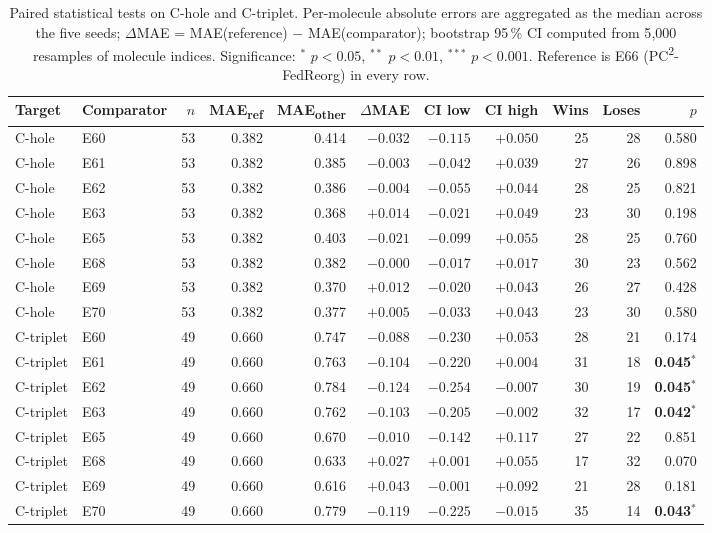\documentclass[11pt,a4paper]{article}
\newcommand{\PC}{PC\textsuperscript{2}-FedReorg}
\begin{document}
\begin{table}[t]
\centering
\small
\caption{Paired statistical tests on C-hole and C-triplet. Per-molecule absolute errors are aggregated as the median across the five seeds; $\Delta$MAE = MAE(reference) $-$ MAE(comparator); bootstrap 95\,\% CI computed from 5{,}000 resamples of molecule indices. Significance: ${}^*$ $p < 0.05$, ${}^{**}$ $p < 0.01$, ${}^{***}$ $p < 0.001$. Reference is E66 (\PC{}) in every row.}\label{tab:paired}
\begin{tabular}{@{}llrrrrrrrrr@{}}
\toprule
Target & Comparator & $n$ & MAE\textsubscript{ref} & MAE\textsubscript{other} & $\Delta$MAE & CI low & CI high & Wins & Loses & $p$ \\
\midrule
C-hole    & E60 & 53 & 0.382 & 0.414 & $-0.032$ & $-0.115$ & $+0.050$ & 25 & 28 & 0.580 \\
C-hole    & E61 & 53 & 0.382 & 0.385 & $-0.003$ & $-0.042$ & $+0.039$ & 27 & 26 & 0.898 \\
C-hole    & E62 & 53 & 0.382 & 0.386 & $-0.004$ & $-0.055$ & $+0.044$ & 28 & 25 & 0.821 \\
C-hole    & E63 & 53 & 0.382 & 0.368 & $+0.014$ & $-0.021$ & $+0.049$ & 23 & 30 & 0.198 \\
C-hole    & E65 & 53 & 0.382 & 0.403 & $-0.021$ & $-0.099$ & $+0.055$ & 28 & 25 & 0.760 \\
C-hole    & E68 & 53 & 0.382 & 0.382 & $-0.000$ & $-0.017$ & $+0.017$ & 30 & 23 & 0.562 \\
C-hole    & E69 & 53 & 0.382 & 0.370 & $+0.012$ & $-0.020$ & $+0.043$ & 26 & 27 & 0.428 \\
C-hole    & E70 & 53 & 0.382 & 0.377 & $+0.005$ & $-0.033$ & $+0.043$ & 23 & 30 & 0.580 \\
\midrule
C-triplet & E60 & 49 & 0.660 & 0.747 & $-0.088$ & $-0.230$ & $+0.053$ & 28 & 21 & 0.174 \\
C-triplet & E61 & 49 & 0.660 & 0.763 & $-0.104$ & $-0.220$ & $+0.004$ & 31 & 18 & \textbf{0.045}${}^*$ \\
C-triplet & E62 & 49 & 0.660 & 0.784 & $-0.124$ & $-0.254$ & $-0.007$ & 30 & 19 & \textbf{0.045}${}^*$ \\
C-triplet & E63 & 49 & 0.660 & 0.762 & $-0.103$ & $-0.205$ & $-0.002$ & 32 & 17 & \textbf{0.042}${}^*$ \\
C-triplet & E65 & 49 & 0.660 & 0.670 & $-0.010$ & $-0.142$ & $+0.117$ & 27 & 22 & 0.851 \\
C-triplet & E68 & 49 & 0.660 & 0.633 & $+0.027$ & $+0.001$ & $+0.055$ & 17 & 32 & 0.070 \\
C-triplet & E69 & 49 & 0.660 & 0.616 & $+0.043$ & $-0.001$ & $+0.092$ & 21 & 28 & 0.181 \\
C-triplet & E70 & 49 & 0.660 & 0.779 & $-0.119$ & $-0.225$ & $-0.015$ & 35 & 14 & \textbf{0.043}${}^*$ \\
\bottomrule
\end{tabular}
\end{table}
\end{document}
